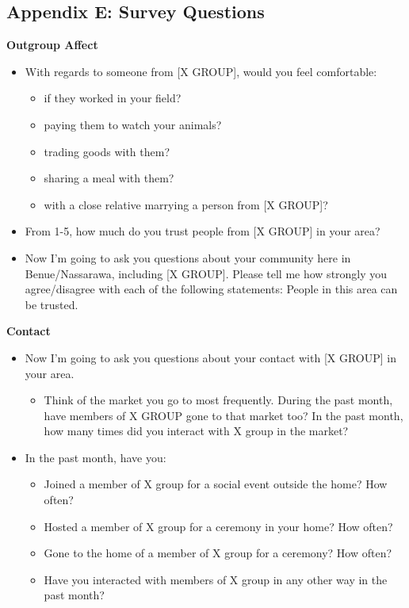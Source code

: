 \documentclass[11pt]{article}
\providecommand{\tightlist}{%
  \setlength{\itemsep}{0pt}\setlength{\parskip}{0pt}}
\begin{document}
\hypertarget{appendix-e-survey-questions}{%
\subsection{Appendix E: Survey
Questions}\label{appendix-e-survey-questions}}

\textbf{Outgroup Affect}

\begin{itemize}
\tightlist
\item
  With regards to someone from {[}X GROUP{]}, would you feel
  comfortable:

  \begin{itemize}
  \tightlist
  \item
    if they worked in your field?
  \item
    paying them to watch your animals?
  \item
    trading goods with them?
  \item
    sharing a meal with them?
  \item
    with a close relative marrying a person from {[}X GROUP{]}?
  \end{itemize}
\item
  From 1-5, how much do you trust people from {[}X GROUP{]} in your
  area?
\item
  Now I'm going to ask you questions about your community here in
  Benue/Nassarawa, including {[}X GROUP{]}. Please tell me how strongly
  you agree/disagree with each of the following statements: People in
  this area can be trusted.
\end{itemize}

\textbf{Contact}

\begin{itemize}
\tightlist
\item
  Now I'm going to ask you questions about your contact with {[}X
  GROUP{]} in your area.

  \begin{itemize}
  \tightlist
  \item
    Think of the market you go to most frequently. During the past
    month, have members of X GROUP gone to that market too? In the past
    month, how many times did you interact with X group in the market?
  \end{itemize}
\item
  In the past month, have you:

  \begin{itemize}
  \tightlist
  \item
    Joined a member of X group for a social event outside the home? How
    often?
  \item
    Hosted a member of X group for a ceremony in your home? How often?
  \item
    Gone to the home of a member of X group for a ceremony? How often?
  \item
    Have you interacted with members of X group in any other way in the
    past month?
  \end{itemize}
\end{itemize}
\end{document}

